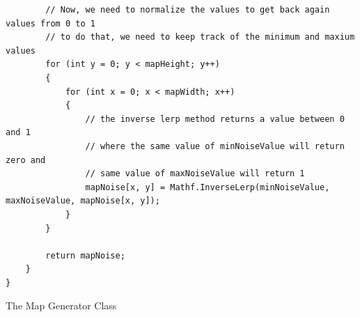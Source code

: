 \documentclass[a4paper,12pt]{book}
\begin{document}
\begin{lstlisting}
        // Now, we need to normalize the values to get back again values from 0 to 1
        // to do that, we need to keep track of the minimum and maxium values
        for (int y = 0; y < mapHeight; y++)
        {
            for (int x = 0; x < mapWidth; x++)
            {
                // the inverse lerp method returns a value between 0 and 1
                // where the same value of minNoiseValue will return zero and
                // same value of maxNoiseValue will return 1
                mapNoise[x, y] = Mathf.InverseLerp(minNoiseValue, maxNoiseValue, mapNoise[x, y]);
            }
        }

        return mapNoise;
    }
}

\end{lstlisting}

The Map Generator Class
\end{document}
